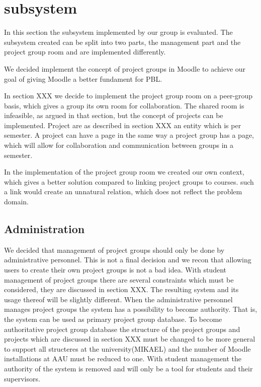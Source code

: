 \section{subsystem}
In this section the subsystem implemented by our group is evaluated. 
The subsystem created can be split into two parts, the management part and the project group room and are implemented differently. 



We decided implement the concept of project groups in Moodle to achieve our goal of giving Moodle a better fundament for PBL.

In section XXX we decide to implement the project group room on a peer-group basis, which gives a group its own room for collaboration. 
The shared room is infeasible, as argued in that section, but the concept of projects can be implemented. 
Project are as described in section XXX an entity which is per semester. 
A project can have a page in the same way a project group has a page, which will allow for collaboration and communication between groups in a semester. 



In the implementation of the project group room we created our own context,  which gives a better solution compared to linking project groups to courses. 
such a link would create an unnatural relation, which does not reflect the problem domain.   









\subsection{Administration}
We decided that management of project groups should only be done by administrative personnel. 
This is not a final decision and we recon that allowing users to create their own project groups is not a bad idea. 
With student management of project groups there are several constraints which must be considered, they are discussed in section XXX. 
The resulting system and its usage thereof will be slightly different. 
When the administrative personnel manages project groups the system has a possibility to become authority. 
That is, the system can be used as primary project group database. 
To become authoritative project group database the structure of the project groups and projects which are discussed in section XXX must be changed to be more general to support all structeres at the university(MIKAEL) and the number of Moodle installations at AAU must be reduced to one. 
With student management the authority of the system is removed and will only be a tool for students and their supervisors.

